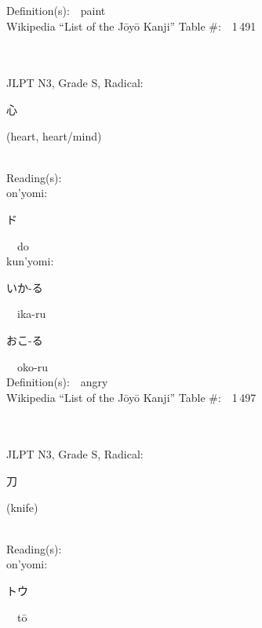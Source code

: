 \begin{multicols}{2}
Definition(s):\ \ paint \\
Wikipedia ``List of the J\=oy\=o Kanji'' Table \#:\ \ 1\,491 \\
\ \ \\
{\fontsize{34pt}{40pt}  }\ \ \\  %
{JLPT N3, Grade S, Radical:\ \ {\begin{CJK}{UTF8}{min} 心 \end{CJK}} (heart, heart/mind) } \\
Reading(s):\ \ \\
{\hspace*{1em}}on'yomi:\ \ \\
{\hspace*{2em}}{\begin{CJK}{UTF8}{min} ド \end{CJK}}\ \ do\ \ \\
{\hspace*{1em}}kun'yomi:\ \ \\
{\hspace*{2em}}{\begin{CJK}{UTF8}{min} いか-る \end{CJK}}\ \ ika-ru\ \ \\
{\hspace*{2em}}{\begin{CJK}{UTF8}{min} おこ-る \end{CJK}}\ \ oko-ru\ \ \\
Definition(s):\ \ angry \\
Wikipedia ``List of the J\=oy\=o Kanji'' Table \#:\ \ 1\,497 \\
\ \ \\
{\fontsize{34pt}{40pt}  }\ \ \\  %
{JLPT N3, Grade S, Radical:\ \ {\begin{CJK}{UTF8}{min} 刀 \end{CJK}} (knife) } \\
Reading(s):\ \ \\
{\hspace*{1em}}on'yomi:\ \ \\
{\hspace*{2em}}{\begin{CJK}{UTF8}{min} トウ \end{CJK}}\ \ t\=o\ \ \\

\end{multicols}
